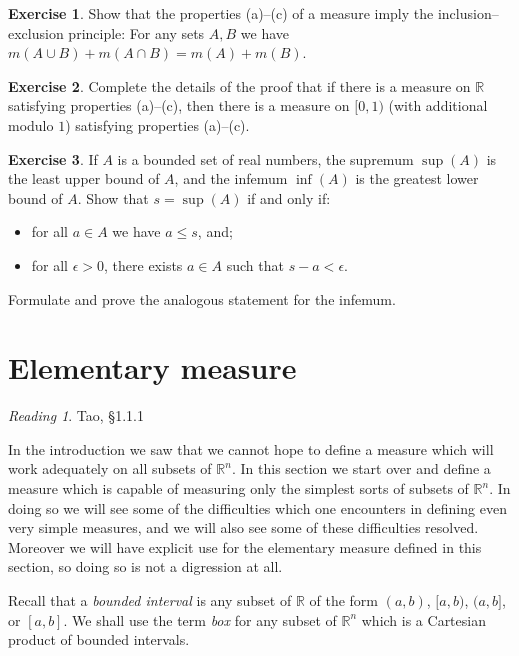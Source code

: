 \documentclass[11pt,oneside]{amsbook}
\newcommand{\RR}{{\mathbb R}}
\theoremstyle{definition}
\newtheorem{exerc}{Exercise}[section]
\theoremstyle{plain}
\theoremstyle{definition}
\theoremstyle{remark}
\newtheorem*{reading}{Reading}
\numberwithin{equation}{section}
\numberwithin{figure}{section}
\begin{document}
\begin{exerc}
  Show that the properties (a)--(c) of a measure imply the inclusion--exclusion principle: For any sets $A,B$ we have $m(A\cup B)+m(A\cap B)=m(A)+m(B)$.
\end{exerc}

\begin{exerc}
  Complete the details of the proof that if there is a measure on $\RR$ satisfying properties (a)--(c), then there is a measure on $[0,1)$ (with additional modulo $1$) satisfying properties (a)--(c).
\end{exerc}

\begin{exerc}
  If $A$ is a bounded set of real numbers, the supremum $\sup(A)$ is the least upper bound of $A$, and the infemum $\inf(A)$ is the greatest lower bound of $A$. Show that $s=\sup(A)$ if and only if:
  \begin{itemize}
    \item for all $a\in A$ we have $a\leq s$, and;
    \item for all $\epsilon>0$, there exists $a\in A$ such that $s-a<\epsilon$.
  \end{itemize}
  Formulate and prove the analogous statement for the infemum.
\end{exerc}

\newpage
\section{Elementary measure}

\begin{reading}
  Tao, \S1.1.1
\end{reading}

In the introduction we saw that we cannot hope to define a measure which will work adequately on all subsets of $\RR^n$. In this section we start over and define a measure which is capable of measuring only the simplest sorts of subsets of $\RR^n$. In doing so we will see some of the difficulties which one encounters in defining even very simple measures, and we will also see some of these difficulties resolved. Moreover we will have explicit use for the elementary measure defined in this section, so doing so is not a digression at all.

Recall that a \emph{bounded interval} is any subset of $\RR$ of the form $(a,b)$, $[a,b)$, $(a,b]$, or $[a,b]$. We shall use the term \emph{box} for any subset of $\RR^n$ which is a Cartesian product of bounded intervals.
\end{document}
